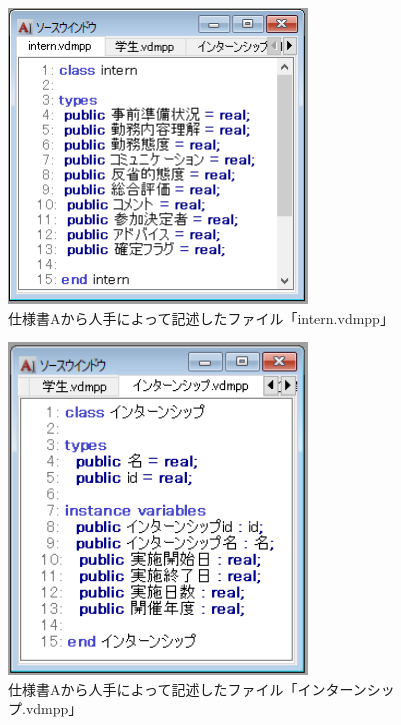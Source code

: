 \begin{figure}[p]
    \begin{center}
    \includegraphics[width=300]{image/speA_vdm1.PNG}
    \caption{仕様書Aから人手によって記述したファイル「intern.vdmpp」}
    \label{fig:speA_vdm1}
    \end{center}
\end{figure}

\begin{figure}[tp]
    \begin{center}
    \includegraphics[width=300]{image/speA_vdm2.PNG}
    \caption{仕様書Aから人手によって記述したファイル「インターンシップ.vdmpp」}
    \label{fig:speA_vdm2}
    \end{center}
\end{figure}

